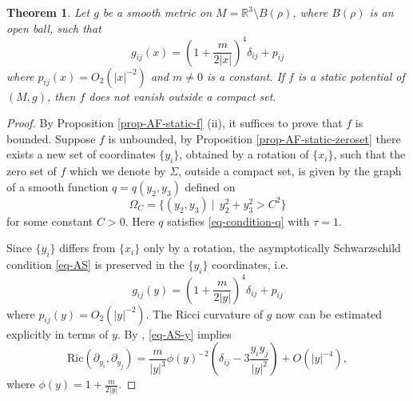 \documentclass[12pt]{amsart}
\newtheorem{thm}{Theorem}[section]
\theoremstyle{remark}
\numberwithin{equation}{section}
\newcommand{\Ric}{\mbox{Ric}}
\newcommand{\R}{\mathbb R}
\newcommand{\be}{\begin{equation}}
\newcommand{\ee}{\end{equation}}
\def\p{\partial}
\def\lf{\left}
\def\ri{\right}
\begin{document}
\begin{thm} \label{thm-AS}
Let  $g$ be a smooth metric on $M = \R^3 \setminus B(\rho)$, where $B(\rho)$ is an open ball,
such that
\be \label{eq-AS}
 g_{ij} (x) = \lf( 1 + \frac{m}{2 |x |} \ri)^4 \delta_{ij} + p_{ij}
\ee
where $   p_{ij} (x) = O_2 ( | x |^{-2} )    $
and $m \neq 0 $ is a constant.
If $f$ is a static potential of $(M, g)$, then $f$ does not vanish outside a compact set.
\end{thm}



\begin{proof}
By Proposition \ref{prop-AF-static-f} (ii),  it suffices to prove that $f$ is  bounded.
Suppose  $f$ is  unbounded,  by Proposition \ref{prop-AF-static-zeroset}
   there exists a new set of coordinates $\{ y_i \}$, obtained by
a rotation of $ \{ x_i \}$,  such that the zero set of $f$ which we denote by $\Sigma$, outside a compact set,  is given by
the graph of a smooth  function $ q = q(y_2, y_3)$ defined on
$$ \Omega_C = \{ (y_2, y_3 ) \ | \
 \ y_2^2 + y_3^2 > C^2 \}$$
for some constant $C>0$. Here $ q $ satisfies \eqref{eq-condition-q} with $\tau = 1$.


Since $ \{ y_i \}$ differs from  $ \{ x_i \}$ only by a rotation,
the asymptotically Schwarzschild condition \eqref{eq-AS} is preserved  in the $\{ y_i \}$ coordinates, i.e.
\be \label{eq-AS-y}
 g_{ij} (y) = \lf( 1 + \frac{m}{2 |y |} \ri)^4 \delta_{ij} +  p_{ij}
\ee
where $   p_{ij} (y) = O_2 ( | y |^{-2} )    $.
The  Ricci curvature of $g$ now can be  estimated explicitly in terms of $y$.
By  \cite[Lemma 1.2]{Huisken-Yau1996},     \eqref{eq-AS-y} implies
\be \label{eq-Ricci-est}
\Ric(\p_{y_i}, \p_{y_j} ) = \frac{m}{ | y|^3 }  \phi (y)^{-2} \lf( \delta_{ij} - 3 \frac{ y_i y_j }{ | y |^2 } \ri) + O ( | y |^{-4} ) ,
\ee
where  $ \phi (y) = 1 + \frac{m}{ 2 | y |}$.



\end{proof}
\end{document}
